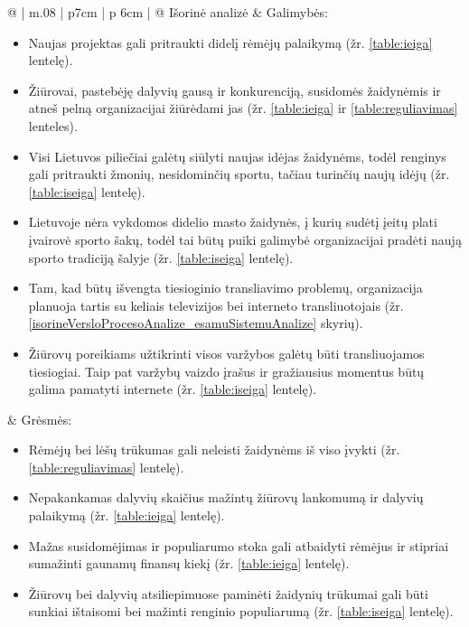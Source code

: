 \documentclass{VUMIFPSkursinis}
\begin{document}
\begin{longtable}{@{\extracolsep{\fill}} | m{.08\hsize} | p{7cm} | p {6cm} | @{}}
      \hline
      Išorinė analizė	& Galimybės:
                        \begin{itemize}
                          \item Naujas projektas gali pritraukti didelį rėmėjų palaikymą (žr. \ref{table:ieiga} lentelę).
                          \item Žiūrovai, pastebėję dalyvių gausą ir konkurenciją, susidomės žaidynėmis ir atneš pelną organizacijai žiūrėdami jas (žr. \ref{table:ieiga} ir \ref{table:reguliavimas} lenteles).
                          \item Visi Lietuvos piliečiai galėtų siūlyti naujas idėjas žaidynėms, todėl renginys gali pritraukti žmonių, nesidominčių sportu, tačiau turinčių naujų idėjų (žr. \ref{table:iseiga} lentelę).
                          \item Lietuvoje nėra vykdomos didelio masto žaidynės, į kurių sudėtį įeitų plati įvairovė sporto šakų, todėl tai būtų puiki galimybė organizacijai pradėti naują sporto tradiciją šalyje (žr. \ref{table:iseiga} lentelę).
                          \item Tam, kad būtų išvengta tiesioginio transliavimo problemų, organizacija planuoja tartis su keliais televizijos bei interneto transliuotojais (žr. \ref{isorineVersloProcesoAnalize_esamuSistemuAnalize} skyrių).
                          \item Žiūrovų poreikiams užtikrinti visos varžybos galėtų būti transliuojamos tiesiogiai. Taip pat varžybų vaizdo įrašus ir gražiausius momentus būtų galima pamatyti internete (žr. \ref{table:iseiga} lentelę).
                        \end{itemize}
                      & Grėsmės:
                        \begin{itemize}
                          \item Rėmėjų bei lėšų trūkumas gali neleisti žaidynėms iš viso įvykti (žr. \ref{table:reguliavimas} lentelę).
                          \item Nepakankamas dalyvių skaičius mažintų žiūrovų lankomumą ir dalyvių palaikymą (žr. \ref{table:ieiga} lentelę).
                          \item Mažas susidomėjimas ir populiarumo stoka gali atbaidyti rėmėjus ir stipriai sumažinti gaunamų finansų kiekį (žr. \ref{table:ieiga} lentelę).
                          \item Žiūrovų bei dalyvių atsiliepimuose paminėti žaidynių trūkumai gali būti sunkiai ištaisomi bei mažinti renginio populiarumą (žr. \ref{table:iseiga} lentelę).
                        \end{itemize}
                        \\
      \hline
    \end{longtable}
\end{document}
